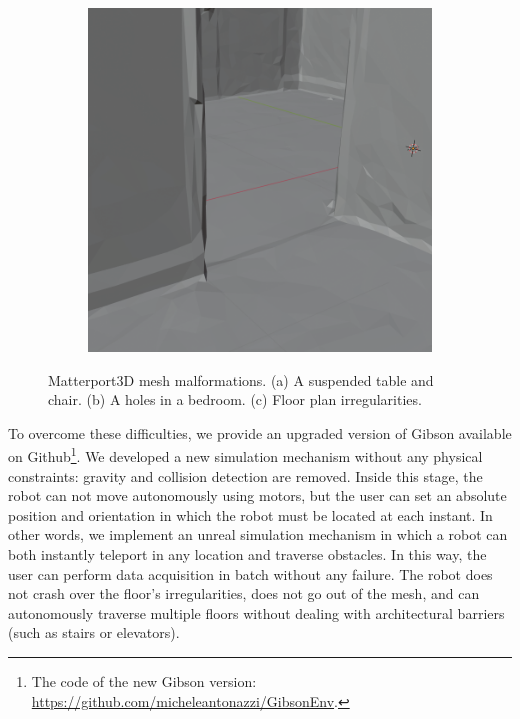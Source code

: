 \begin{figure}[h!]
\begin{subfigure}[b]{0.32\linewidth}
		\caption{}
		\label{fig:matterport_issues_hole}
	\end{subfigure}
	\hfil
	\begin{subfigure}[b]{0.32\linewidth}
		\centering
		\includegraphics[width=\textwidth]{images/floor_plan_irregularity.png}
		\caption{}
		\label{fig:matterport_issues_floor_plan}
	\end{subfigure}
	\caption{Matterport3D mesh malformations. (a) A suspended table and chair. (b) A holes in a bedroom. (c) Floor plan irregularities.}
\end{figure}


To overcome these difficulties, we provide an upgraded version of Gibson available on Github\footnote{The code of the new Gibson version: \url{https://github.com/micheleantonazzi/GibsonEnv}.}. We developed a new simulation mechanism without any physical constraints: gravity and collision detection are removed. Inside this stage, the robot can not move autonomously using motors, but the user can set an absolute position and orientation in which the robot must be located at each instant. In other words, we implement an unreal simulation mechanism in which a robot can both instantly teleport in any location and traverse obstacles. In this way, the user can perform data acquisition in batch without any failure. The robot does not crash over the floor's irregularities, does not go out of the mesh, and can autonomously traverse multiple floors without dealing with architectural barriers (such as stairs or elevators).

